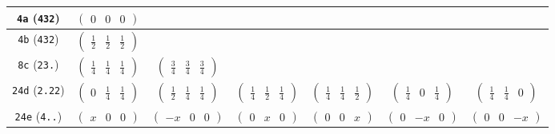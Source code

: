 \documentclass[fleqn,9pt,landscape]{jsarticle}
\begin{document}
\begin{center}
\begin{longtable}{ccccccc}
{\tt 4a} ({\tt 432}) & $ \begin{pmatrix} 0 & 0 & 0 \end{pmatrix} $ & $  $ & $  $ & $  $ & $  $ & $  $ \\ \hline
{\tt 4b} ({\tt 432}) & $ \begin{pmatrix} \frac{1}{2} & \frac{1}{2} & \frac{1}{2} \end{pmatrix} $ & $  $ & $  $ & $  $ & $  $ & $  $ \\ \hline
{\tt 8c} ({\tt 23.}) & $ \begin{pmatrix} \frac{1}{4} & \frac{1}{4} & \frac{1}{4} \end{pmatrix} $ & $ \begin{pmatrix} \frac{3}{4} & \frac{3}{4} & \frac{3}{4} \end{pmatrix} $ & $  $ & $  $ & $  $ & $  $ \\ \hline
{\tt 24d} ({\tt 2.22}) & $ \begin{pmatrix} 0 & \frac{1}{4} & \frac{1}{4} \end{pmatrix} $ & $ \begin{pmatrix} \frac{1}{2} & \frac{1}{4} & \frac{1}{4} \end{pmatrix} $ & $ \begin{pmatrix} \frac{1}{4} & \frac{1}{2} & \frac{1}{4} \end{pmatrix} $ & $ \begin{pmatrix} \frac{1}{4} & \frac{1}{4} & \frac{1}{2} \end{pmatrix} $ & $ \begin{pmatrix} \frac{1}{4} & 0 & \frac{1}{4} \end{pmatrix} $ & $ \begin{pmatrix} \frac{1}{4} & \frac{1}{4} & 0 \end{pmatrix} $ \\ \hline
{\tt 24e} ({\tt 4..}) & $ \begin{pmatrix} x & 0 & 0 \end{pmatrix} $ & $ \begin{pmatrix} - x & 0 & 0 \end{pmatrix} $ & $ \begin{pmatrix} 0 & x & 0 \end{pmatrix} $ & $ \begin{pmatrix} 0 & 0 & x \end{pmatrix} $ & $ \begin{pmatrix} 0 & - x & 0 \end{pmatrix} $ & $ \begin{pmatrix} 0 & 0 & - x \end{pmatrix} $ \\ \hline

\end{longtable}
\end{center}
\end{document}

